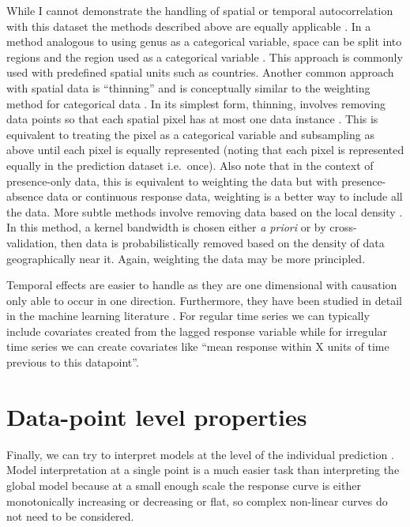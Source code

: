 \documentclass[10pt,]{article}
\begin{document}
While I cannot demonstrate the handling of spatial or temporal autocorrelation with this dataset the methods described above are equally applicable \citep{elith2009species}.
In a method analogous to using genus as a categorical variable, space can be split into regions and the region used as a categorical variable \citep{appelhans2015evaluating}.
This approach is commonly used with predefined spatial units such as countries.
Another common approach with spatial data is ``thinning'' and is conceptually similar to the weighting method for categorical data \citep{elith2010art}.
In its simplest form, thinning, involves removing data points so that each spatial pixel has at most one data instance \citep{elith2010art, verbruggen2013improving}.
This is equivalent to treating the pixel as a categorical variable and subsampling as above until each pixel is equally represented (noting that each pixel is represented equally in the prediction dataset i.e.~once).
Also note that in the context of presence-only data, this is equivalent to weighting the data but with presence-absence data or continuous response data, weighting is a better way to include all the data.
More subtle methods involve removing data based on the local density \citep{verbruggen2013improving}.
In this method, a kernel bandwidth is chosen either \emph{a priori} or by cross-validation, then data is probabilistically removed based on the density of data geographically near it.
Again, weighting the data may be more principled.

Temporal effects are easier to handle as they are one dimensional with causation only able to occur in one direction.
Furthermore, they have been studied in detail in the machine learning literature \citep{jeong2008non}.
For regular time series we can typically include covariates created from the lagged response variable while for irregular time series we can create covariates like ``mean response within X units of time previous to this datapoint''.

\section{Data-point level properties}\label{data-point-level-properties}

Finally, we can try to interpret models at the level of the individual prediction \citep{lime, ribeiro2016should, lundberg2017unified, ribeiro2016nothing}.
Model interpretation at a single point is a much easier task than interpreting the global model because at a small enough scale the response curve is either monotonically increasing or decreasing or flat, so complex non-linear curves do not need to be considered.
\end{document}
